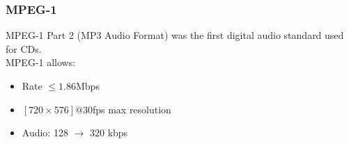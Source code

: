 \subsubsection{MPEG-1}
MPEG-1 Part 2 (MP3 Audio Format) was the first digital audio standard used for CDs.\\
MPEG-1 allows:
\begin{itemize}
    \item Rate $\leq 1.86$Mbps
    \item $[720\times 576]@30$fps max resolution
    \item Audio: 128 $\to$ 320 kbps
\end{itemize}
